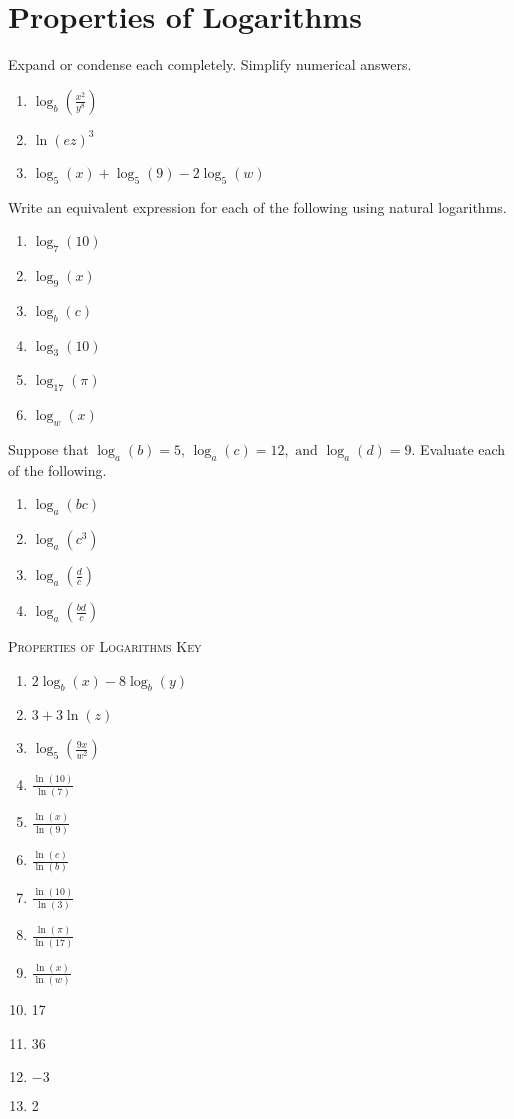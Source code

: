 \chapter{Properties of Logarithms}

Expand or condense each completely. Simplify numerical answers.
\begin{enumerate}
	\item $\log_b\left(\frac{x^2}{y^8}\right)$
	\item $\ln\left(ez\right)^3$
	\item $\log_5(x) + \log_5(9) - 2\log_5(w)$
\setcounter{Review}{\value{enumi}}
\end{enumerate}

Write an equivalent expression for each of the following using natural logarithms.
\begin{enumerate}
\setcounter{enumi}{\value{Review}}
	\item $\log_7(10)$
	\item $\log_9(x)$
	\item $\log_b(c)$
    \item $\log_3(10)$
    \item $\log_{17}(\pi)$    
    \item $\log_{w}(x)$
\setcounter{Review}{\value{enumi}}
\end{enumerate}

Suppose that $\log_a(b) = 5, \, \log_a(c) = 12, \text{ and } \log_a(d) = 9$. Evaluate each of the following.
\begin{enumerate}	\setcounter{enumi}{\value{Review}}
	\item $\log_a(bc)$
    \item $\log_a(c^3)$
    \item $\log_a\left(\frac{d}{c}\right)$
    \item $\log_a\left(\frac{bd}{c}\right)$
\end{enumerate}
\setcounter{Review}{\value{enumi}}

\newpage

\textsc{Properties of Logarithms Key}

\begin{enumerate}
	\item $2\log_b(x) - 8\log_b(y)$
    \item $3 + 3\ln(z)$
    \item $\log_5\left(\frac{9x}{w^2}\right)$
    \item $\frac{\ln(10)}{\ln(7)}$
    \item $\frac{\ln(x)}{\ln(9)}$
    \item $\frac{\ln(c)}{\ln(b)}$
    \item $\frac{\ln(10)}{\ln(3)}$
    \item $\frac{\ln(\pi)}{\ln(17)}$
    \item $\frac{\ln(x)}{\ln(w)}$
    \item 17
    \item 36
    \item $-3$
    \item 2
\end{enumerate}